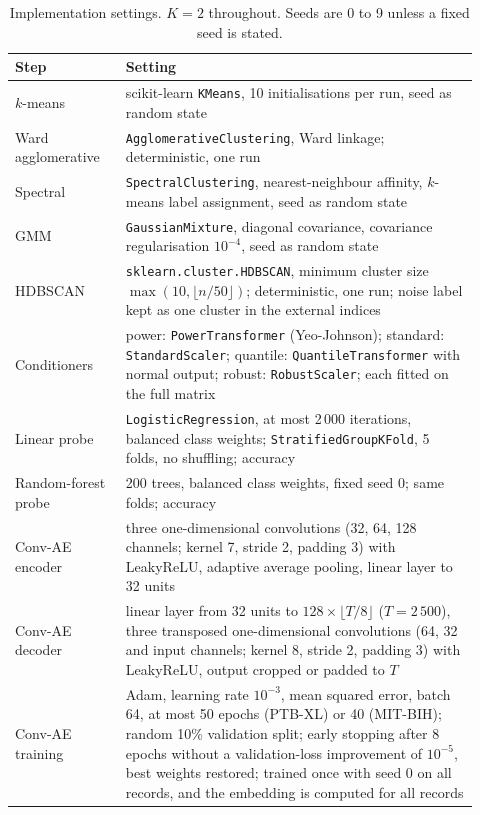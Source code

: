 \documentclass[preprint,11pt]{elsarticle}
\begin{document}
\begin{table}[ht]
\centering
\footnotesize
\caption{Implementation settings. $K=2$ throughout. Seeds are 0 to 9 unless a fixed seed
is stated.}
\label{tab:impl}
\begin{tabular}{p{0.22\linewidth}p{0.70\linewidth}}
\toprule
Step & Setting \\
\midrule
$k$-means & scikit-learn \texttt{KMeans}, 10 initialisations per run, seed as random state \\
Ward agglomerative & \texttt{AgglomerativeClustering}, Ward linkage; deterministic, one run \\
Spectral & \texttt{SpectralClustering}, nearest-neighbour affinity, $k$-means label
assignment, seed as random state \\
GMM & \texttt{GaussianMixture}, diagonal covariance, covariance regularisation
$10^{-4}$, seed as random state \\
HDBSCAN & \texttt{sklearn.cluster.HDBSCAN}, minimum cluster size $\max(10,\lfloor
n/50\rfloor)$; deterministic, one run; noise label kept as one cluster in the external
indices \\
Conditioners & power: \texttt{PowerTransformer} (Yeo-Johnson); standard:
\texttt{StandardScaler}; quantile: \texttt{QuantileTransformer} with normal output;
robust: \texttt{RobustScaler}; each fitted on the full matrix \\
Linear probe & \texttt{LogisticRegression}, at most 2\,000 iterations, balanced class
weights; \texttt{StratifiedGroupKFold}, 5 folds, no shuffling; accuracy \\
Random-forest probe & 200 trees, balanced class weights, fixed seed 0; same folds;
accuracy \\
Conv-AE encoder & three one-dimensional convolutions (32, 64, 128 channels; kernel 7, stride 2,
padding 3) with LeakyReLU, adaptive average pooling, linear layer to 32 units \\
Conv-AE decoder & linear layer from 32 units to $128 \times \lfloor T/8 \rfloor$ ($T=2\,500$),
three transposed one-dimensional convolutions (64, 32 and input channels; kernel 8, stride 2,
padding 3) with LeakyReLU, output cropped or padded to $T$ \\
Conv-AE training & Adam, learning rate $10^{-3}$, mean squared error, batch 64, at most
50 epochs (PTB-XL) or 40 (MIT-BIH); random 10\% validation split; early stopping after 8
epochs without a validation-loss improvement of $10^{-5}$, best weights restored; trained
once with seed 0 on all records, and the embedding is computed for all records \\

\end{tabular}
\end{table}
\end{document}

